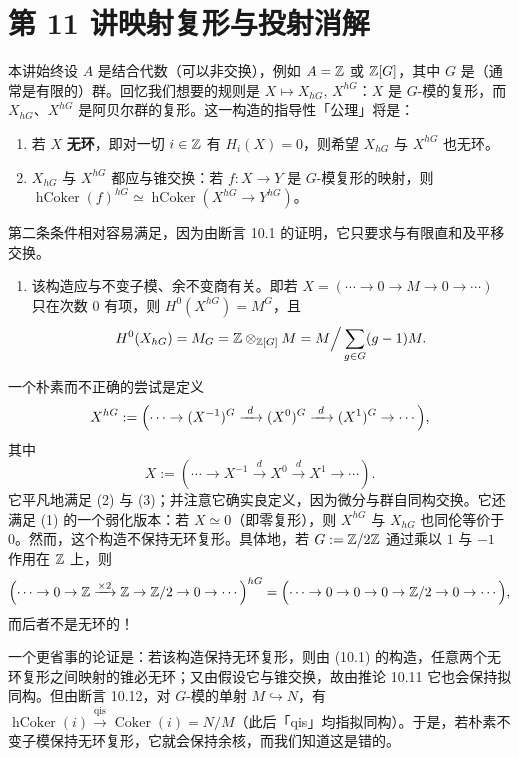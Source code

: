 \section*{第 11 讲\quad 映射复形与投射消解}

本讲始终设 $A$ 是结合代数（可以非交换），例如 $A=\mathbb{Z}$ 或 $\mathbb{Z}[G]$，其中 $G$ 是（通常是有限的）群。回忆我们想要的规则是 $X\mapsto X_{hG},\,X^{hG}$：$X$ 是 $G$-模的复形，而 $X_{hG}$、$X^{hG}$ 是阿贝尔群的复形。这一构造的指导性「公理」将是：

\begin{enumerate}[label=(\arabic*),leftmargin=2.4em]
\item 若 $X$ \textbf{无环}，即对一切 $i\in\mathbb{Z}$ 有 $H_i(X)=0$，则希望 $X_{hG}$ 与 $X^{hG}$ 也无环。
\item $X_{hG}$ 与 $X^{hG}$ 都应与锥交换：若 $f\colon X\to Y$ 是 $G$-模复形的映射，则 $\operatorname{hCoker}(f)^{hG}\simeq\operatorname{hCoker}(X^{hG}\to Y^{hG})$。
\end{enumerate}

第二条条件相对容易满足，因为由断言 10.1 的证明，它只要求与有限直和及平移交换。

\begin{enumerate}[label=(\arabic*),leftmargin=2.4em,start=3]
\item 该构造应与不变子模、余不变商有关。即若 $X=(\cdots\to0\to M\to0\to\cdots)$ 只在次数 $0$ 有项，则 $H^0(X^{hG})=M^G$，且
\[
H^0(X_{hG})=M_G=\mathbb{Z}\otimes_{\mathbb{Z}[G]}M=M\Big/\sum_{g\in G}(g-1)M.
\]
\end{enumerate}

一个朴素而不正确的尝试是定义
\[
X^{hG}:=\Bigl(\cdots\to(X^{-1})^G\xrightarrow{\ d\ }(X^0)^G\xrightarrow{\ d\ }(X^1)^G\to\cdots\Bigr),
\]
其中
\[
X:=(\cdots\to X^{-1}\xrightarrow{\ d\ }X^0\xrightarrow{\ d\ }X^1\to\cdots).
\]
它平凡地满足 (2) 与 (3)；并注意它确实良定义，因为微分与群自同构交换。它还满足 (1) 的一个弱化版本：若 $X\simeq0$（即零复形），则 $X^{hG}$ 与 $X_{hG}$ 也同伦等价于 $0$。然而，这个构造不保持无环复形。具体地，若 $G:=\mathbb{Z}/2\mathbb{Z}$ 通过乘以 $1$ 与 $-1$ 作用在 $\mathbb{Z}$ 上，则
\[
\Bigl(\cdots\to0\to\mathbb{Z}\xrightarrow{\times2}\mathbb{Z}\to\mathbb{Z}/2\to0\to\cdots\Bigr)^{hG}
=\Bigl(\cdots\to0\to0\to0\to\mathbb{Z}/2\to0\to\cdots\Bigr),
\]
而后者不是无环的！

一个更省事的论证是：若该构造保持无环复形，则由 (10.1) 的构造，任意两个无环复形之间映射的锥必无环；又由假设它与锥交换，故由推论 10.11 它也会保持拟同构。但由断言 10.12，对 $G$-模的单射 $M\hookrightarrow N$，有 $\operatorname{hCoker}(i)\xrightarrow{\mathrm{qis}}\operatorname{Coker}(i)=N/M$（此后「qis」均指拟同构）。于是，若朴素不变子模保持无环复形，它就会保持余核，而我们知道这是错的。

